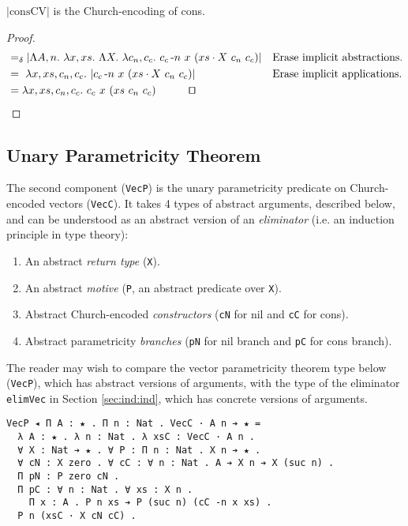 \documentclass[a4paper,envcountsame,envcountsect]{llncs}
\newcommand{\eqed}[0]{\tag*{\qed}}
\newcommand{\refsec}[1]{Section \ref{sec:#1}}
\newcommand{\labsec}[1]{\label{sec:#1}}
\newcommand{\lablem}[1]{\label{lem:#1}}
\newcommand{\nega}[0]{\ensuremath{{\text -}}}
\newcommand{\earg}[1]{\,\,#1}
\newcommand{\iarg}[1]{\ensuremath{\,\nega #1}}
\newcommand{\targ}[1]{\ensuremath{\cdot #1}}
\newcommand{\erase}[1]{\ensuremath{\lvert #1 \rvert}}
\newcommand{\fun}[1]{\lambda #1 .~}
\newcommand{\all}[1]{\Lambda #1 .~}
\newcommand{\by}[1]{\text{#1}}
\newcommand{\name}[1]{\textrm{#1}}
\begin{document}
\begin{lemma}
\erase{\name{consCV}} is the Church-encoding of cons.
\lablem{conscv}
\end{lemma}

\begin{proof}
{\small
\begin{align*}
  &=_\delta \erase{
    \all{A, n} \fun{x, xs}
    \all{X} \fun{c_n, c_c}
    c_c \iarg{n} \earg{x} \earg (xs \targ{X} \earg{c_n} \earg{c_c})
  }
  && \by{Erase implicit abstractions.}
  \\
  &=~ \fun{x, xs, c_n, c_c} \erase{
    c_c \iarg{n} \earg{x} \earg (xs \targ{X} \earg{c_n} \earg{c_c})
  }
  && \by{Erase implicit applications.}
  \\
  &= \fun{x, xs, c_n, c_c} c_c \earg{x} \earg (xs \earg{c_n} \earg{c_c})
  \eqed
\end{align*}
}
\end{proof}

\subsection{Unary Parametricity Theorem}
\labsec{ind:param}

The second component (\texttt{VecP}) is the unary parametricity
predicate on Church-encoded vectors (\texttt{VecC}). It takes 4 types
of abstract arguments, described below, and can be understood as an
abstract version of an \textit{eliminator} (i.e. an induction
principle in type theory):

\begin{enumerate}
\item An abstract \textit{return type} (\texttt{X}).
\item An abstract \textit{motive} (\texttt{P}, an abstract predicate
  over \texttt{X}).
\item Abstract Church-encoded \textit{constructors}
  (\texttt{cN} for nil and \texttt{cC} for cons).
\item Abstract parametricity \textit{branches}
  (\texttt{pN} for nil branch and \texttt{pC} for cons branch).
\end{enumerate}

The reader may wish to compare the
vector parametricity theorem type
below (\texttt{VecP}), which has abstract versions of arguments, with the type of
the eliminator \texttt{elimVec} in \refsec{ind:ind}, which has
concrete versions of arguments.

\begin{verbatim}
VecP ◂ Π A : ★ . Π n : Nat . VecC · A n ➔ ★ =
  λ A : ★ . λ n : Nat . λ xsC : VecC · A n .
  ∀ X : Nat ➔ ★ . ∀ P : Π n : Nat . X n ➔ ★ .
  ∀ cN : X zero . ∀ cC : ∀ n : Nat . A ➔ X n ➔ X (suc n) .
  Π pN : P zero cN .
  Π pC : ∀ n : Nat . ∀ xs : X n . 
    Π x : A . P n xs ➔ P (suc n) (cC -n x xs) .
  P n (xsC · X cN cC) .
\end{verbatim}
\end{document}
